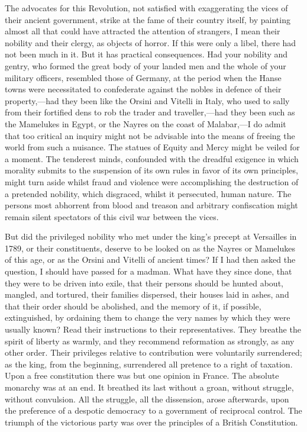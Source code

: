 The advocates for this Revolution, not satisfied with exaggerating the vices of their ancient government, strike at the fame of their country itself, by painting almost all that could have attracted the attention of strangers, I mean their nobility and their clergy, as objects of horror. If this were only a libel, there had not been much in it. But it has practical consequences. Had your nobility and gentry, who formed the great body of your landed men and the whole of your military officers, resembled those of Germany, at the period when the Hanse towns were necessitated to confederate against the nobles in defence of their property,—had they been like the Orsini and Vitelli in Italy, who used to sally from their fortified dens to rob the trader and traveller,—had they been such as the Mamelukes in Egypt, or the Nayres on the coast of Malabar,—I do admit that too critical an inquiry might not be advisable into the means of freeing the world from such a nuisance. The statues of Equity and Mercy might be veiled for a moment. The tenderest minds, confounded with the dreadful exigence in which morality submits to the suspension of its own rules in favor of its own principles, might turn aside whilst fraud and violence were accomplishing the destruction of a pretended nobility, which disgraced, whilst it persecuted, human nature. The persons most abhorrent from blood and treason and arbitrary confiscation might remain silent spectators of this civil war between the vices.

But did the privileged nobility who met under the king's precept at Versailles in 1789, or their constituents, deserve to be looked on as the Nayres or Mamelukes of this age, or as the Orsini and Vitelli of ancient times? If I had then asked the question, I should have passed for a madman. What have they since done, that they were to be driven into exile, that their persons should be hunted about, mangled, and tortured, their families dispersed, their houses laid in ashes, and that their order should be abolished, and the memory of it, if possible, extinguished, by ordaining them to change the very names by which they were usually known? Read their instructions to their representatives. They breathe the spirit of liberty as warmly, and they recommend reformation as strongly, as any other order. Their privileges relative to contribution were voluntarily surrendered; as the king, from the beginning, surrendered all pretence to a right of taxation. Upon a free constitution there was but one opinion in France. The absolute monarchy was at an end. It breathed its last without a groan, without struggle, without convulsion. All the struggle, all the dissension, arose afterwards, upon the preference of a despotic democracy to a government of reciprocal control. The triumph of the victorious party was over the principles of a British Constitution.

